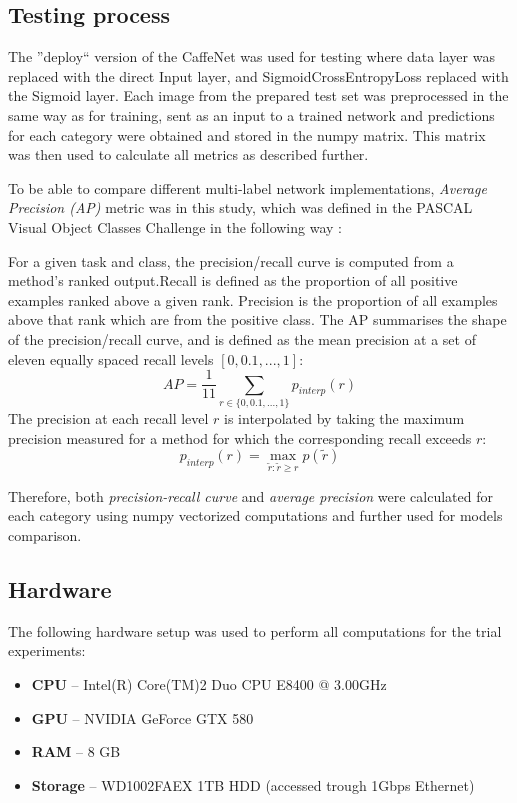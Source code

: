     \subsection{Testing process}
    \label{sec:trial-testing}
    The ''deploy`` version of the CaffeNet was used for testing where data layer was replaced with the direct Input layer, and SigmoidCrossEntropyLoss replaced with the Sigmoid layer. Each image from the prepared test set was preprocessed in the same way as for training, sent as an input to a trained network and predictions for each category were obtained and stored in the numpy matrix. This matrix was then used to calculate all metrics as described further.
    
    To be able to compare different multi-label network implementations, \textit{Average Precision (AP)} metric was in this study, which was defined in the PASCAL Visual Object Classes Challenge in the following way \cite{Everingham2010PASCAL-VOC}:
    
    \begin{displayquote}
    For a given task and class, the precision/recall curve is computed from a method’s ranked output.Recall is defined as the proportion of all positive examples ranked above a given rank. Precision is the proportion of all examples above that rank which are from the positive class. The AP summarises the shape of the precision/recall curve, and is defined as the mean precision at a set of eleven equally spaced recall levels $[0,0.1, . . . ,1]$:
    $$
    AP = \frac{1}{11} \sum_{r \in \{0, 0.1, ..., 1\}} p_{interp}(r)
    $$
    The precision at each recall level $r$ is interpolated by taking the maximum precision measured for a method for which the corresponding recall exceeds $r$:
    $$
    p_{interp}(r) = \max_{\tilde{r}:\tilde{r} \ge r} p(\tilde{r})
    $$
    \end{displayquote}
    
    Therefore, both \textit{precision-recall curve} and \textit{average precision} were calculated for each category using numpy vectorized computations and further used for models comparison.
    
    \subsection{Hardware}
    \label{sec:trial-hw}
    The following hardware setup was used to perform all computations for the trial experiments:
    \begin{itemize}
        \item \textbf{CPU} -- Intel(R) Core(TM)2 Duo CPU E8400 @ 3.00GHz
        \item \textbf{GPU} -- NVIDIA GeForce GTX 580
        \item \textbf{RAM} -- 8 GB
        \item \textbf{Storage} -- WD1002FAEX 1TB HDD (accessed trough 1Gbps Ethernet)
    \end{itemize}


